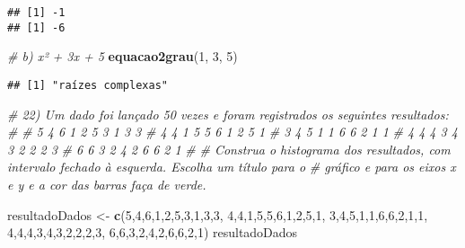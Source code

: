\documentclass[]{article}
\newenvironment{Shaded}{\begin{snugshade}}{\end{snugshade}}
\newcommand{\CommentTok}[1]{\textcolor[rgb]{0.56,0.35,0.01}{\textit{#1}}}
\newcommand{\DecValTok}[1]{\textcolor[rgb]{0.00,0.00,0.81}{#1}}
\newcommand{\KeywordTok}[1]{\textcolor[rgb]{0.13,0.29,0.53}{\textbf{#1}}}
\newcommand{\NormalTok}[1]{#1}
\newcommand{\StringTok}[1]{\textcolor[rgb]{0.31,0.60,0.02}{#1}}
\begin{document}
\begin{verbatim}
## [1] -1
## [1] -6
\end{verbatim}

\begin{Shaded}
\begin{Highlighting}[]
\CommentTok{# b) x² + 3x + 5}
\KeywordTok{equacao2grau}\NormalTok{(}\DecValTok{1}\NormalTok{, }\DecValTok{3}\NormalTok{, }\DecValTok{5}\NormalTok{)}
\end{Highlighting}
\end{Shaded}

\begin{verbatim}
## [1] "raízes complexas"
\end{verbatim}

\begin{Shaded}
\begin{Highlighting}[]
\CommentTok{# 22) Um dado foi lançado 50 vezes e foram registrados os seguintes resultados:}
\CommentTok{#}
\CommentTok{# 5 4 6 1 2 5 3 1 3 3}
\CommentTok{# 4 4 1 5 5 6 1 2 5 1}
\CommentTok{# 3 4 5 1 1 6 6 2 1 1}
\CommentTok{# 4 4 4 3 4 3 2 2 2 3}
\CommentTok{# 6 6 3 2 4 2 6 6 2 1}
\CommentTok{# }
\CommentTok{# Construa o histograma dos resultados, com intervalo fechado à esquerda. Escolha um título para o}
\CommentTok{# gráfico e para os eixos x e y e a cor das barras faça de verde.}

\NormalTok{resultadoDados <-}\StringTok{ }\KeywordTok{c}\NormalTok{(}\DecValTok{5}\NormalTok{,}\DecValTok{4}\NormalTok{,}\DecValTok{6}\NormalTok{,}\DecValTok{1}\NormalTok{,}\DecValTok{2}\NormalTok{,}\DecValTok{5}\NormalTok{,}\DecValTok{3}\NormalTok{,}\DecValTok{1}\NormalTok{,}\DecValTok{3}\NormalTok{,}\DecValTok{3}\NormalTok{, }\DecValTok{4}\NormalTok{,}\DecValTok{4}\NormalTok{,}\DecValTok{1}\NormalTok{,}\DecValTok{5}\NormalTok{,}\DecValTok{5}\NormalTok{,}\DecValTok{6}\NormalTok{,}\DecValTok{1}\NormalTok{,}\DecValTok{2}\NormalTok{,}\DecValTok{5}\NormalTok{,}\DecValTok{1}\NormalTok{, }\DecValTok{3}\NormalTok{,}\DecValTok{4}\NormalTok{,}\DecValTok{5}\NormalTok{,}\DecValTok{1}\NormalTok{,}\DecValTok{1}\NormalTok{,}\DecValTok{6}\NormalTok{,}\DecValTok{6}\NormalTok{,}\DecValTok{2}\NormalTok{,}\DecValTok{1}\NormalTok{,}\DecValTok{1}\NormalTok{, }\DecValTok{4}\NormalTok{,}\DecValTok{4}\NormalTok{,}\DecValTok{4}\NormalTok{,}\DecValTok{3}\NormalTok{,}\DecValTok{4}\NormalTok{,}\DecValTok{3}\NormalTok{,}\DecValTok{2}\NormalTok{,}\DecValTok{2}\NormalTok{,}\DecValTok{2}\NormalTok{,}\DecValTok{3}\NormalTok{, }\DecValTok{6}\NormalTok{,}\DecValTok{6}\NormalTok{,}\DecValTok{3}\NormalTok{,}\DecValTok{2}\NormalTok{,}\DecValTok{4}\NormalTok{,}\DecValTok{2}\NormalTok{,}\DecValTok{6}\NormalTok{,}\DecValTok{6}\NormalTok{,}\DecValTok{2}\NormalTok{,}\DecValTok{1}\NormalTok{)}
\NormalTok{resultadoDados}
\end{Highlighting}
\end{Shaded}
\end{document}
